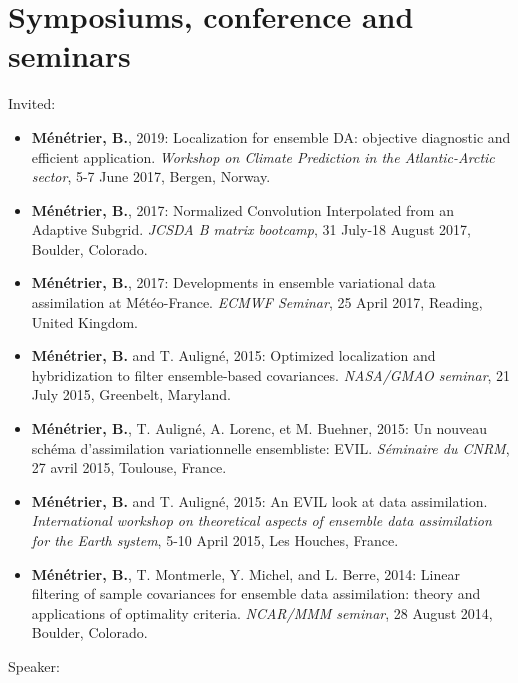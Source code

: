 \documentclass[a4paper,9pt]{scrreprt}
\begin{document}
\section*{Symposiums, conference and  seminars}
Invited:\vspace{0.2cm}
\begin{itemize}
\item \textbf{Ménétrier, B.}, 2019: Localization for ensemble DA: objective diagnostic and efficient application. \textit{Workshop on Climate Prediction in the Atlantic-Arctic sector}, 5-7 June 2017, Bergen, Norway.\vspace{-0.1cm}
\item \textbf{Ménétrier, B.}, 2017: Normalized Convolution Interpolated from an Adaptive Subgrid. \textit{JCSDA B matrix bootcamp}, 31 July-18 August 2017, Boulder, Colorado.\vspace{-0.1cm}
\item \textbf{Ménétrier, B.}, 2017: Developments in ensemble variational data assimilation at Météo-France. \textit{ECMWF Seminar}, 25 April 2017, Reading, United Kingdom.\vspace{-0.1cm}
\item \textbf{Ménétrier, B.} and T. Auligné, 2015: Optimized localization and hybridization to filter ensemble-based covariances. \textit{NASA/GMAO seminar}, 21 July 2015, Greenbelt, Maryland.\vspace{-0.1cm}
\item \textbf{Ménétrier, B.}, T. Auligné, A. Lorenc, et M. Buehner, 2015: Un nouveau schéma d’assimilation variationnelle ensembliste: EVIL. \textit{Séminaire du CNRM}, 27 avril 2015, Toulouse, France.\vspace{-0.1cm}
\item \textbf{Ménétrier, B.} and T. Auligné, 2015: An EVIL look at data assimilation. \textit{International workshop on theoretical aspects of ensemble data assimilation for the Earth system}, 5-10 April 2015, Les Houches, France.\vspace{-0.1cm}
\item \textbf{Ménétrier, B.}, T. Montmerle, Y. Michel, and L. Berre, 2014: Linear filtering of sample covariances for ensemble data assimilation: theory and applications of optimality criteria. \textit{NCAR/MMM seminar}, 28 August 2014, Boulder, Colorado.
\end{itemize}
$  $\\
Speaker:\vspace{0.2cm}
\end{document}
